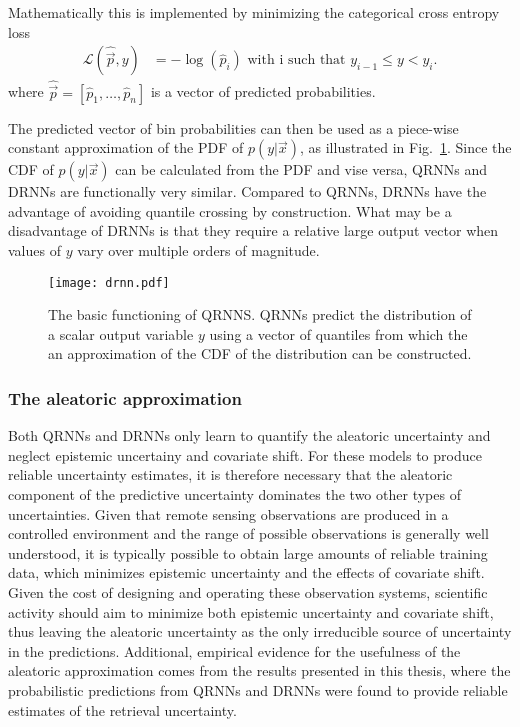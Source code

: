 Mathematically this is implemented by minimizing the
categorical cross entropy loss
\begin{align}
  \mathcal{L}(\hat{\vec{p}}, y) &=  -\log(\hat{p}_i) \text { with i such that } y_{i - 1} \leq y < y_i.
\end{align}
where $\hat{\vec{p}} = [\hat{p}_1, \ldots, \hat{p}_n]$ is a vector of predicted probabilities.

The predicted vector of bin probabilities can then be used as a piece-wise
constant approximation of the PDF of $p(y | \vec{x})$, as illustrated in
Fig.~\ref{fig:machine_learning:drnn}. Since the CDF of $p(y | \vec{x})$ can be
calculated from the PDF and vise versa, QRNNs and DRNNs are functionally very
similar. Compared to QRNNs, DRNNs have the advantage of avoiding quantile
crossing by construction. What may be a disadvantage of DRNNs is that they require
a relative large output vector when values of $y$ vary over multiple orders of
magnitude.

\begin{figure}[btp]
  \centering
  \texttt{[image: drnn.pdf]}
  \caption{The basic functioning of QRNNS. QRNNs predict the distribution of
    a scalar output variable $y$ using a vector of quantiles from which the
    an approximation of the CDF of the distribution can be constructed.}
  \label{fig:machine_learning:drnn}
\end{figure}

\subsubsection{The aleatoric approximation}

Both QRNNs and DRNNs only learn to quantify the aleatoric uncertainty and
neglect epistemic uncertainy and covariate shift. For these models to produce
reliable uncertainty estimates, it is therefore necessary that the aleatoric
component of the predictive uncertainty dominates the two other types of
uncertainties. Given that remote sensing observations are produced in a
controlled environment and the range of possible observations is generally well
understood, it is typically possible to obtain large amounts of reliable
training data, which minimizes epistemic uncertainty and the effects of
covariate shift. Given the cost of designing and operating these observation
systems, scientific activity should aim to minimize both epistemic uncertainty
and covariate shift, thus leaving the aleatoric uncertainty as the only
irreducible source of uncertainty in the predictions. Additional, empirical
evidence for the usefulness of the aleatoric approximation comes from the
results presented in this thesis, where the probabilistic predictions from QRNNs
and DRNNs were found to provide reliable estimates of the retrieval uncertainty.

